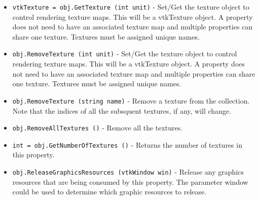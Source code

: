 \begin{itemize}
\item  \verb|vtkTexture = obj.GetTexture (int unit)| -  Set/Get the texture object to control rendering texture maps.  This will
 be a vtkTexture object. A property does not need to have an associated
 texture map and multiple properties can share one texture. Textures
 must be assigned unique names.

\item  \verb|obj.RemoveTexture (int unit)| -  Set/Get the texture object to control rendering texture maps.  This will
 be a vtkTexture object. A property does not need to have an associated
 texture map and multiple properties can share one texture. Textures
 must be assigned unique names.

\item  \verb|obj.RemoveTexture (string name)| -  Remove a texture from the collection. Note that the
 indices of all the subsquent textures, if any, will change.

\item  \verb|obj.RemoveAllTextures ()| -  Remove all the textures.

\item  \verb|int = obj.GetNumberOfTextures ()| -  Returns the number of textures in this property.

\item  \verb|obj.ReleaseGraphicsResources (vtkWindow win)| -  Release any graphics resources that are being consumed by this
 property. The parameter window could be used to determine which graphic
 resources to release.

\end{itemize}
